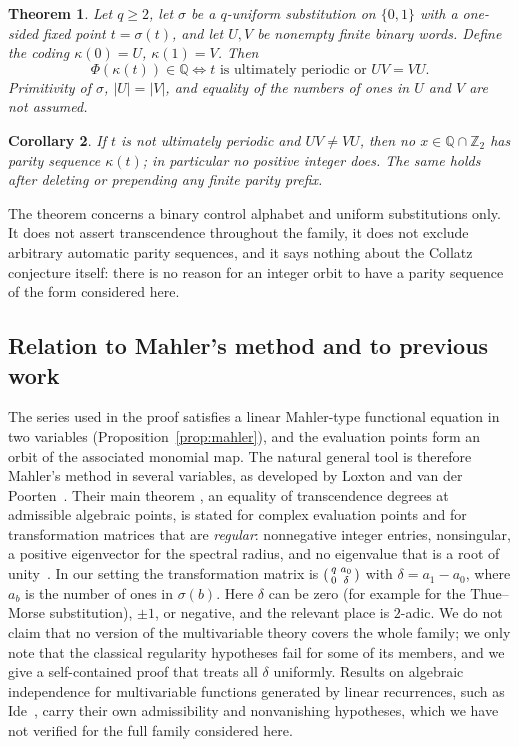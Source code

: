 \documentclass[11pt]{amsart}
\newtheorem{theorem}{Theorem}[section]
\newtheorem{corollary}[theorem]{Corollary}
\theoremstyle{remark}
\theoremstyle{definition}
\numberwithin{equation}{section}
\newcommand{\Q}{\mathbb{Q}}
\newcommand{\Z}{\mathbb{Z}}
\begin{document}
\begin{theorem}\label{thm:main}
Let $q\ge2$, let $\sigma$ be a $q$-uniform substitution on $\{0,1\}$ with a one-sided fixed point $t=\sigma(t)$, and let $U,V$ be nonempty finite binary words. Define the coding $\kappa(0)=U$, $\kappa(1)=V$. Then
\[
\Phi(\kappa(t))\in\Q \iff t \text{ is ultimately periodic or } UV=VU .
\]
Primitivity of $\sigma$, $|U|=|V|$, and equality of the numbers of ones in $U$ and $V$ are not assumed.
\end{theorem}

\begin{corollary}\label{cor:integer}
If $t$ is not ultimately periodic and $UV\ne VU$, then no $x\in\Q\cap\Z_2$ has parity sequence $\kappa(t)$; in particular no positive integer does. The same holds after deleting or prepending any finite parity prefix.
\end{corollary}

The theorem concerns a binary control alphabet and uniform substitutions only. It does not assert transcendence throughout the family, it does not exclude arbitrary automatic parity sequences, and it says nothing about the Collatz conjecture itself: there is no reason for an integer orbit to have a parity sequence of the form considered here.

\subsection{Relation to Mahler's method and to previous work}\label{subsec:prior}

The series used in the proof satisfies a linear Mahler-type functional equation in two variables (Proposition~\ref{prop:mahler}), and the evaluation points form an orbit of the associated monomial map. The natural general tool is therefore Mahler's method in several variables, as developed by Loxton and van der Poorten~\cite{LvdP1982}. Their main theorem \cite[Theorem~1]{LvdP1982}, an equality of transcendence degrees at admissible algebraic points, is stated for complex evaluation points and for transformation matrices that are \emph{regular}: nonnegative integer entries, nonsingular, a positive eigenvector for the spectral radius, and no eigenvalue that is a root of unity~\cite[\S2]{LvdP1982}. In our setting the transformation matrix is $\begin{psmallmatrix} q & a_0\\ 0 & \delta\end{psmallmatrix}$ with $\delta=a_1-a_0$, where $a_b$ is the number of ones in $\sigma(b)$. Here $\delta$ can be zero (for example for the Thue--Morse substitution), $\pm1$, or negative, and the relevant place is $2$-adic. We do not claim that no version of the multivariable theory covers the whole family; we only note that the classical regularity hypotheses fail for some of its members, and we give a self-contained proof that treats all $\delta$ uniformly. Results on algebraic independence for multivariable functions generated by linear recurrences, such as Ide~\cite{Ide2019}, carry their own admissibility and nonvanishing hypotheses, which we have not verified for the full family considered here.
\end{document}
